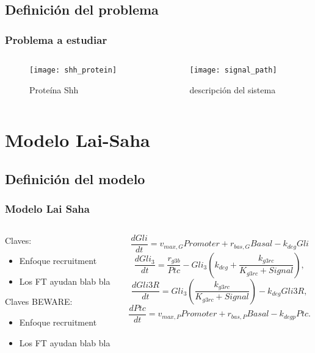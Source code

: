 \documentclass{beamer}
\begin{document}
\subsection{Definición del problema}

\begin{frame}
\frametitle{Problema a estudiar}
\begin{columns}
	\begin{column}{0.5\textwidth}
\begin{figure}
\texttt{[image: shh\_protein]}\caption{Proteína Shh}
\end{figure}
\end{column}
\begin{column}{0.5\textwidth}
\begin{figure}
	\texttt{[image: signal\_path]}\caption{descripción del sistema}
\end{figure}
\end{column}
\end{columns}
\end{frame}

\section{Modelo Lai-Saha}
\subsection{Definición del modelo}
\begin{frame}
  \frametitle{Modelo Lai Saha}
\begin{columns}
	\begin{column}{0.5\textwidth}
		Claves:
		\begin{itemize}
			\item Enfoque recruitment
			\item Los FT ayudan blab bla 
		\end{itemize}
			Claves BEWARE:
	\begin{itemize}
		\item Enfoque recruitment
		\item Los FT ayudan blab bla 
	\end{itemize}
	\end{column}
	\begin{column}{0.5\textwidth}
		{\tiny\[ \frac{dGli}{dt} = v_{max,G}Promoter+r_{bas,G}Basal-k_{deg}Gli \]}
		{\tiny\[ \frac{dGli_3}{dt} = \frac{r_{g3b}}{Ptc}-Gli_3\left(k_{deg}+\frac{k_{g3rc}}{K_{g3rc}+Signal}\right), \]}
		{\tiny\[ \frac{dGli3R}{dt}= Gli_3\left(\frac{k_{g3rc}}{K_{g3rc}+Signal}\right)-k_{deg}Gli3R, \]}
		{\tiny\[ \frac{dPtc}{dt} = v_{max,P}Promoter+r_{bas,P}Basal-k_{degp}Ptc.\]}

	\end{column}
\end{columns}
\end{frame}
\end{document}
